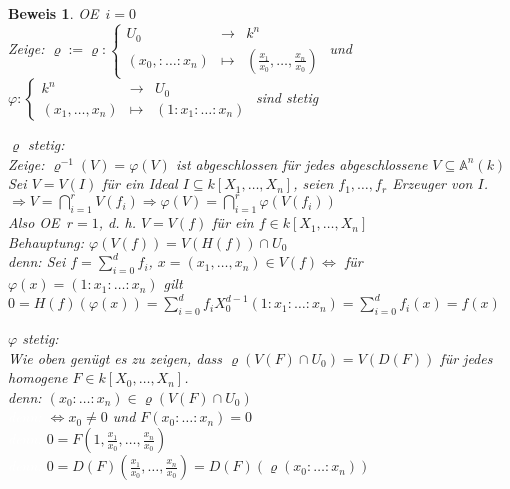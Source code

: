 \documentclass[a4paper,12pt]{report}
\theoremstyle{break}
\theoremstyle{nonumberbreak}
\newtheorem{Bew}{Beweis}
\theoremstyle{nonumberplain}
\newcommand{\A}{\mathbb{A}}
\renewcommand{\OE}{O\!\!E~}
\begin{document}
\begin{Bew}
\OE $i=0$\\
\emph{Zeige:} $\varrho:=\varrho: \left\{\begin{array}{rcl}U_0&\to&k^n\\(x_0,:\ldots :x_n)&\mapsto&(\frac{x_1}{x_0},\ldots ,\frac{x_n}{x_0})\end{array}\right.$ und $\varphi: \left\{\begin{array}{rcl}k^n&\to&U_0\\(x_1,\ldots ,x_n)&\mapsto&(1:x_1:\ldots :x_n)\end{array}\right.$ sind stetig\\

\begin{description}
\item \emph{$\varrho$ stetig:}\\
	\emph{Zeige:} $\varrho^{-1}(V)=\varphi(V)$ ist abgeschlossen f\"ur jedes abgeschlossene $V\subseteq\A^n(k)$\\
	Sei $V=V(I)$ f\"ur ein Ideal $I\subseteq k[X_1,\ldots ,X_n]$, seien $f_1,\ldots ,f_r$ Erzeuger von $I$.\\
	$\Rightarrow V=\bigcap\limits_{i=1}^rV(f_i)\Rightarrow \varphi(V)=\bigcap\limits_{i=1}^r\varphi(V(f_i))$\\
	Also \OE $r=1$, d. h. $V=V(f)$ f\"ur ein $f\in k[X_1,\ldots ,X_n]$\\
	\emph{Behauptung:} $\varphi(V(f))=V(H(f))\cap U_0$\\
	\emph{denn:} Sei $f=\sum\limits_{i=0}^df_i$, $x=(x_1,\ldots ,x_n)\in V(f)\Leftrightarrow$ f\"ur $\varphi(x)=(1:x_1:\ldots:x_n)$ gilt $0=H(f)(\varphi(x))=\sum\limits_{i=0}^df_iX_0^{d-1}(1:x_1:\ldots :x_n)=\sum\limits_{i=0}^df_i(x)=f(x)$

\item\emph{$\varphi$ stetig:}\\
	Wie oben gen\"ugt es zu zeigen, dass $\varrho(V(F)\cap U_0)=V(D(F))$ f\"ur jedes homogene $F\in k[X_0,\ldots ,X_n]$.\\
	\emph{denn:} $(x_0:\ldots :x_n)\in \varrho(V(F)\cap U_0)$\\
	\textcolor{white}{\emph{denn:}} $\Leftrightarrow x_0\not=0$ und $F(x_0:\ldots :x_n)=0$\\
	\textcolor{white}{\emph{denn:}} $0=F(1,\frac{x_1}{x_0},\ldots ,\frac{x_n}{x_0})$\\
	\textcolor{white}{\emph{denn:}} $0=D(F)(\frac{x_1}{x_0},\ldots ,\frac{x_n}{x_0})= D(F)(\varrho(x_0:\ldots :x_n))$
\end{description}\end{Bew}
\end{document}

